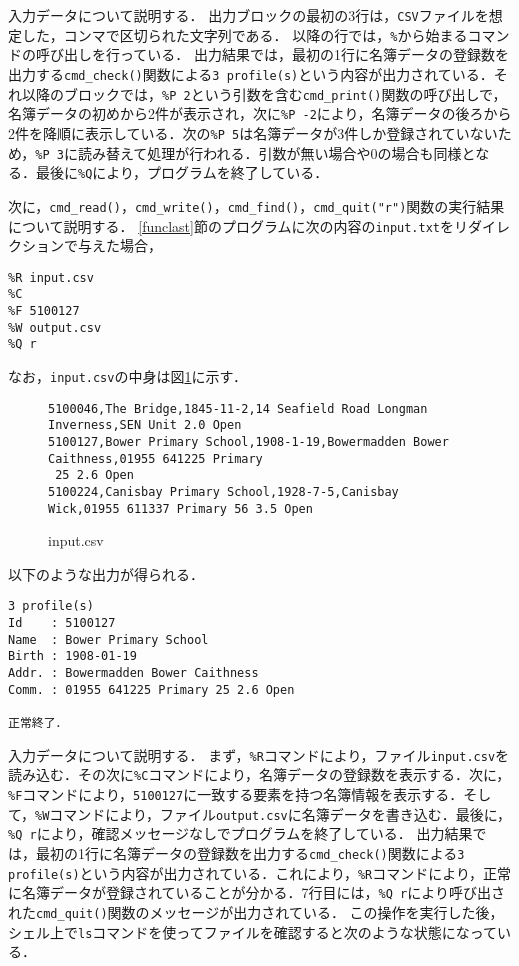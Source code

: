 入力データについて説明する．
出力ブロックの最初の3行は，\verb|CSV|ファイルを想定した，コンマで区切られた文字列である．
以降の行では，\verb|%|から始まるコマンドの呼び出しを行っている．
出力結果では，最初の1行に名簿データの登録数を出力する\verb|cmd_check()|関数による\verb|3 profile(s)|という内容が出力されている．それ以降のブロックでは，\verb|%P 2|という引数を含む\verb|cmd_print()|関数の呼び出しで，名簿データの初めから2件が表示され，次に\verb|%P -2|により，名簿データの後ろから2件を降順に表示している．次の\verb|%P 5|は名簿データが3件しか登録されていないため，\verb|%P 3|に読み替えて処理が行われる．引数が無い場合や$0$の場合も同様となる．最後に\verb|%Q|により，プログラムを終了している．

次に，\verb|cmd_read()|，\verb|cmd_write()|，\verb|cmd_find()|，\verb|cmd_quit("r")|関数の実行結果について説明する．
\ref{funclast}節のプログラムに次の内容の\verb|input.txt|をリダイレクションで与えた場合，

{\fontsize{10pt}{11pt} \selectfont
 \begin{verbatim}
%R input.csv
%C
%F 5100127
%W output.csv
%Q r
 \end{verbatim}
}

\noindent
なお，\verb|input.csv|の中身は図\ref{input.csv}に示す．
\begin{figure}[b]
{\fontsize{10pt}{11pt} \selectfont
 \begin{verbatim}
5100046,The Bridge,1845-11-2,14 Seafield Road Longman Inverness,SEN Unit 2.0 Open
5100127,Bower Primary School,1908-1-19,Bowermadden Bower Caithness,01955 641225 Primary
 25 2.6 Open
5100224,Canisbay Primary School,1928-7-5,Canisbay Wick,01955 611337 Primary 56 3.5 Open
 \end{verbatim}
}
\caption{input.csv}
\label{input.csv}
\end{figure}

\noindent %
以下のような出力が得られる．

{\fontsize{10pt}{11pt} \selectfont
 \begin{verbatim}
3 profile(s)
Id    : 5100127
Name  : Bower Primary School
Birth : 1908-01-19
Addr. : Bowermadden Bower Caithness
Comm. : 01955 641225 Primary 25 2.6 Open

正常終了．
 \end{verbatim}
}

入力データについて説明する．
まず，\verb|%R|コマンドにより，ファイル\verb|input.csv|を読み込む．その次に\verb|%C|コマンドにより，名簿データの登録数を表示する．次に，\verb|%F|コマンドにより，\verb|5100127|に一致する要素を持つ名簿情報を表示する．そして，\verb|%W|コマンドにより，ファイル\verb|output.csv|に名簿データを書き込む．最後に，\verb|%Q r|により，確認メッセージなしでプログラムを終了している．
出力結果では，最初の1行に名簿データの登録数を出力する\verb|cmd_check()|関数による\verb|3 profile(s)|という内容が出力されている．これにより，\verb|%R|コマンドにより，正常に名簿データが登録されていることが分かる．7行目には，\verb|%Q r|により呼び出された\verb|cmd_quit()|関数のメッセージが出力されている．
この操作を実行した後，シェル上で\verb|ls|コマンドを使ってファイルを確認すると次のような状態になっている．

